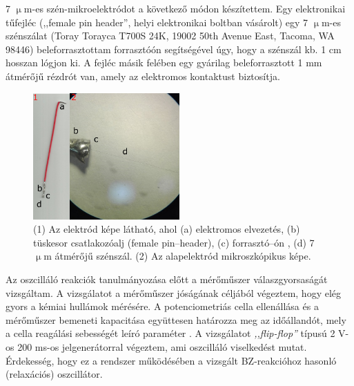 7 $\upmu$m-es szén-mikroelektródot a következő módon készítettem. Egy elektronikai tűfejléc (,,female pin header'', helyi elektronikai boltban vásárolt) egy 7 $\upmu$m-es szénszálat (Toray Torayca T700S 24K, 19002 50th Avenue East, Tacoma, WA 98446) beleforrasztottam forrasztóón segítségével úgy, hogy a szénszál kb. 1 cm hosszan lógjon ki. A fejléc másik felében egy gyárilag beleforrasztott 1 mm átmérőjű rézdrót van, amely az elektromos kontaktust biztosítja.
\begin{figure}[!h]
\centering
\includegraphics[width=0.5\textwidth]{img/szenmikro.png}
\caption{(1) Az elektród képe látható, ahol (a) elektromos elvezetés, (b) tüskesor csatlakozóalj (female pin--header), (c) forrasztó--ón , (d) 7 $\upmu$m átmérőjű szénszál. (2) Az alapelektród mikroszkópikus képe.}
\label{fig:ionophores}
\end{figure}

Az oszcilláló reakciók tanulmányozása előtt a mérőműszer válaszgyorsaságát vizsgáltam. A vizsgálatot a mérőműszer jóságának céljából végeztem, hogy elég gyors a kémiai hullámok mérésére. A potenciometriás cella ellenállása és a mérőműszer bemeneti kapacitása együttesen határozza meg az időállandót, mely a cella reagálási sebességét leíró paraméter \cite{kiss2015deconvolution}. A vizsgálatot \emph{,,flip-flop''} típusú 2 V-os 200 ms-os jelgenerátorral végeztem, ami oszcilláló viselkedést mutat. Érdekesség, hogy ez a rendszer működésében a vizsgált BZ-reakcióhoz hasonló (relaxációs) oszcillátor.

